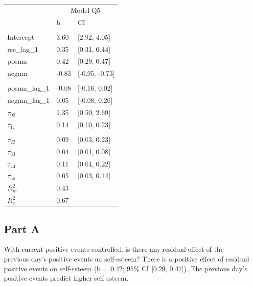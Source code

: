 \documentclass[]{article}
\begin{document}
\begin{table}[H]
\centering
\begin{tabular}{lll}
\toprule
\multicolumn{1}{c}{ } & \multicolumn{2}{c}{Model Q5} \\
\cmidrule(l{2pt}r{2pt}){2-3}
 & b & CI\\
\midrule
\addlinespace[0.3em]
\multicolumn{3}{l}{\textbf{Fixed}}\\
\hspace{1em}Intercept & 3.60 & [2.92, 4.05]\\
\hspace{1em}rse\_lag\_1 & 0.35 & [0.31, 0.44]\\
\hspace{1em}posmn & 0.42 & [0.29, 0.47]\\
\hspace{1em}negmn & -0.83 & [-0.95, -0.73]\\
\addlinespace[0.3em]
\multicolumn{3}{l}{\textbf{Random}}\\
\hspace{1em}posmn\_lag\_1 & -0.08 & [-0.16, 0.02]\\
\hspace{1em}negmn\_lag\_1 & 0.05 & [-0.08, 0.20]\\
\hspace{1em}$\tau_{00}$ & 1.35 & [0.50, 2.69]\\
\hspace{1em}$\tau_{11}$ & 0.14 & [0.10, 0.23]\\
\addlinespace[0.3em]
\multicolumn{3}{l}{\textbf{Fit}}\\
\hspace{1em}$\tau_{22}$ & 0.09 & [0.03, 0.23]\\
\hspace{1em}$\tau_{33}$ & 0.04 & [0.01, 0.08]\\
$\tau_{44}$ & 0.11 & [0.04, 0.22]\\
$\tau_{55}$ & 0.05 & [0.03, 0.14]\\
$R^2_m$ & 0.43 & \\
$R^2_c$ & 0.67 & \\
\bottomrule
\end{tabular}
\end{table}

\subsection{Part A}\label{part-a-4}

With current positive events controlled, is there any residual effect of
the previous day's positive events on self-esteem? There is a positive
effect of residual positive events on self-esteem (b = 0.42; 95\% CI
{[}0.29, 0.47{]}). The previous day's positive events predict higher
self esteem.
\end{document}
